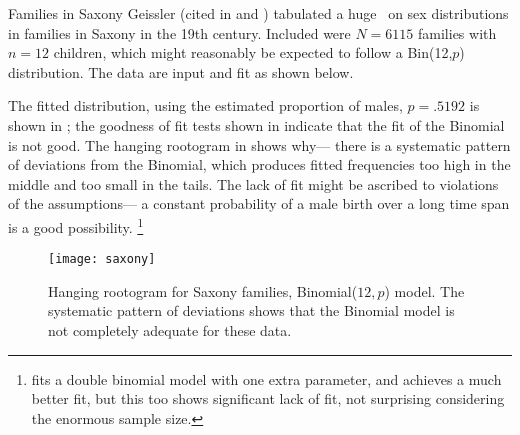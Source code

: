 \begin{Example}[saxony1]{Families in Saxony}
Geissler
(cited in \citet{SokalRholf:69}
and \citet{Lindsey:95})
tabulated a huge \Dset\ on sex distributions in families in Saxony
in the 19th century.  Included were $N=6115$ families with $n=12$ children,
which might reasonably be expected to follow a Bin(12,$p$) distribution.
The data are input and fit as shown below.


The fitted distribution, using the estimated proportion of males,
$p = .5192$ is shown in ;
the goodness of fit tests shown in 
indicate that the fit of the Binomial is not good.
The hanging rootogram in  shows why---%
there is a systematic pattern of deviations from the Binomial,
which produces fitted frequencies too high in the middle and too small
in the tails.
The lack of fit might be ascribed to violations of the assumptions---%
a constant probability of a male birth over a long time span
is a good possibility.
\footnote{\citet[p. 131]{Lindsey:95}
fits a double binomial model with one extra parameter,
and achieves a much better fit, but this too
shows significant lack of fit, not surprising considering the
enormous sample size.}
\begin{Output}
\caption{Fit of the Binomial($12, p$) to the Families in Saxony data: Observed and fitted frequencies}\label{out:saxony.1}
\small

\end{Output}
\begin{Output}
\caption{Fit of the Binomial($12, p$) to the Families in Saxiony data: Goodness of fit tests}\label{out:saxony.2}
\small

\end{Output}

\begin{figure}[htb]
  \centering
  \texttt{[image: saxony]}
  \caption[Hanging rootogram for Saxony families, Binomial model]{Hanging rootogram for Saxony families, Binomial($12, p$) model.
The systematic pattern of deviations shows that the Binomial model is not completely adequate for these data.}\label{fig:saxony}
\end{figure}
\end{Example}

